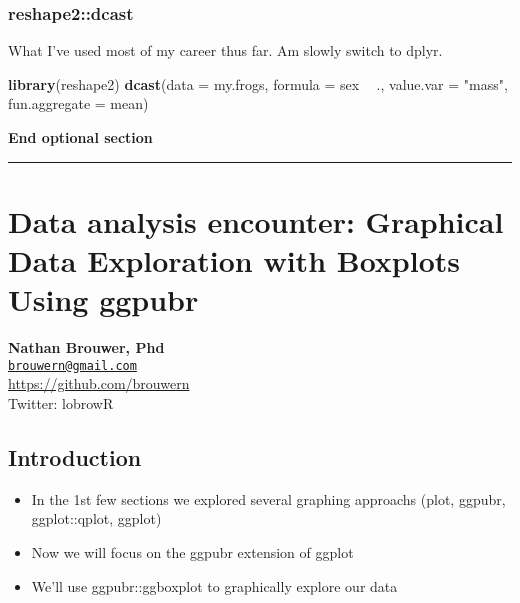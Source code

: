 \documentclass[]{book}
\newenvironment{Shaded}{\begin{snugshade}}{\end{snugshade}}
\newcommand{\KeywordTok}[1]{\textcolor[rgb]{0.13,0.29,0.53}{\textbf{#1}}}
\newcommand{\DataTypeTok}[1]{\textcolor[rgb]{0.13,0.29,0.53}{#1}}
\newcommand{\StringTok}[1]{\textcolor[rgb]{0.31,0.60,0.02}{#1}}
\newcommand{\OperatorTok}[1]{\textcolor[rgb]{0.81,0.36,0.00}{\textbf{#1}}}
\newcommand{\NormalTok}[1]{#1}
\providecommand{\tightlist}{%
  \setlength{\itemsep}{0pt}\setlength{\parskip}{0pt}}
\theoremstyle{definition}
\theoremstyle{definition}
\theoremstyle{definition}
\theoremstyle{remark}
\begin{document}
\subsection{reshape2::dcast}\label{reshape2dcast}

What I've used most of my career thus far. Am slowly switch to dplyr.

\begin{Shaded}
\begin{Highlighting}[]
\KeywordTok{library}\NormalTok{(reshape2)}
\KeywordTok{dcast}\NormalTok{(}\DataTypeTok{data =}\NormalTok{ my.frogs,}
      \DataTypeTok{formula =}\NormalTok{ sex }\OperatorTok{~}\StringTok{ }\NormalTok{.,}
      \DataTypeTok{value.var =} \StringTok{"mass"}\NormalTok{,}
      \DataTypeTok{fun.aggregate  =}\NormalTok{ mean)}
\end{Highlighting}
\end{Shaded}

\textbf{End optional section}

\begin{center}\rule{0.5\linewidth}{\linethickness}\end{center}

\chapter{Data analysis encounter: Graphical Data Exploration with
Boxplots Using
ggpubr}\label{data-analysis-encounter-graphical-data-exploration-with-boxplots-using-ggpubr}

\textbf{Nathan Brouwer, Phd}\\
\href{mailto:brouwern@gmail.com}{\nolinkurl{brouwern@gmail.com}}\\
\url{https://github.com/brouwern}\\
Twitter: lobrowR

\section{Introduction}\label{introduction-9}

\begin{itemize}
\tightlist
\item
  In the 1st few sections we explored several graphing approachs (plot,
  ggpubr, ggplot::qplot, ggplot)
\item
  Now we will focus on the ggpubr extension of ggplot
\item
  We'll use ggpubr::ggboxplot to graphically explore our data
\end{itemize}
\end{document}
